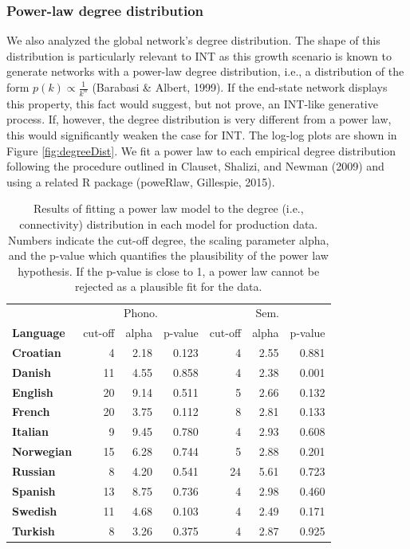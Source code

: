 \documentclass[english,floatsintext,man]{apa6}
\theoremstyle{definition}
\theoremstyle{definition}
\theoremstyle{definition}
\theoremstyle{remark}
\begin{document}
\subsubsection{Power-law degree
distribution}\label{power-law-degree-distribution}

We also analyzed the global network's degree distribution. The shape of
this distribution is particularly relevant to INT as this growth
scenario is known to generate networks with a power-law degree
distribution, i.e., a distribution of the form
\(p(k) \propto \frac{1}{k^{\alpha}}\) (Barabasi \& Albert, 1999). If the
end-state network displays this property, this fact would suggest, but
not prove, an INT-like generative process. If, however, the degree
distribution is very different from a power law, this would
significantly weaken the case for INT. The log-log plots are shown in
Figure \ref{fig:degreeDist}. We fit a power law to each empirical degree
distribution following the procedure outlined in Clauset, Shalizi, and
Newman (2009) and using a related R package (poweRlaw, Gillespie, 2015).

\begin{table}

\caption{\label{tab:powerLawProd}Results of fitting a power law model to the degree (i.e., connectivity) distribution in each model for production data. Numbers indicate the cut-off degree, the scaling parameter alpha, and the p-value which quantifies the plausibility of the power law hypothesis. If the p-value is close to 1, a power law cannot be rejected as a plausible fit for the data.}
\centering
\begin{tabular}[t]{>{\bfseries}lrrrrrr}
\toprule
\multicolumn{1}{c}{} & \multicolumn{3}{c}{Phono.} & \multicolumn{3}{c}{Sem.} \\
\cmidrule(l{2pt}r{2pt}){2-4} \cmidrule(l{2pt}r{2pt}){5-7}
Language & cut-off & alpha & p-value & cut-off & alpha & p-value\\
\midrule
Croatian & 4 & 2.18 & 0.123 & 4 & 2.55 & 0.881\\
Danish & 11 & 4.55 & 0.858 & 4 & 2.38 & 0.001\\
English & 20 & 9.14 & 0.511 & 5 & 2.66 & 0.132\\
French & 20 & 3.75 & 0.112 & 8 & 2.81 & 0.133\\
Italian & 9 & 9.45 & 0.780 & 4 & 2.93 & 0.608\\
Norwegian & 15 & 6.28 & 0.744 & 5 & 2.88 & 0.201\\
Russian & 8 & 4.20 & 0.541 & 24 & 5.61 & 0.723\\
Spanish & 13 & 8.75 & 0.736 & 4 & 2.98 & 0.460\\
Swedish & 11 & 4.68 & 0.103 & 4 & 2.49 & 0.171\\
Turkish & 8 & 3.26 & 0.375 & 4 & 2.87 & 0.925\\
\bottomrule
\end{tabular}
\end{table}
\end{document}
